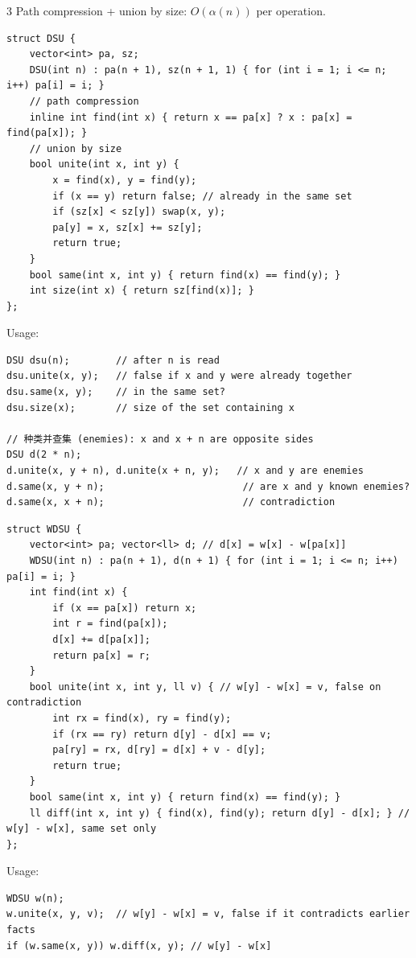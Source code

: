 \documentclass[8pt]{extarticle}
\begin{document}
\begin{multicols*}{3}
Path compression + union by size: $O(\alpha(n))$ per operation.

\begin{lstlisting}
struct DSU {
    vector<int> pa, sz;
    DSU(int n) : pa(n + 1), sz(n + 1, 1) { for (int i = 1; i <= n; i++) pa[i] = i; }
    // path compression
    inline int find(int x) { return x == pa[x] ? x : pa[x] = find(pa[x]); }
    // union by size
    bool unite(int x, int y) {
        x = find(x), y = find(y);
        if (x == y) return false; // already in the same set
        if (sz[x] < sz[y]) swap(x, y);
        pa[y] = x, sz[x] += sz[y];
        return true;
    }
    bool same(int x, int y) { return find(x) == find(y); }
    int size(int x) { return sz[find(x)]; }
};
\end{lstlisting}

Usage:

\begin{lstlisting}
DSU dsu(n);        // after n is read
dsu.unite(x, y);   // false if x and y were already together
dsu.same(x, y);    // in the same set?
dsu.size(x);       // size of the set containing x

// 种类并查集 (enemies): x and x + n are opposite sides
DSU d(2 * n);
d.unite(x, y + n), d.unite(x + n, y);   // x and y are enemies
d.same(x, y + n);                        // are x and y known enemies?
d.same(x, x + n);                        // contradiction
\end{lstlisting}

\begin{lstlisting}
struct WDSU {
    vector<int> pa; vector<ll> d; // d[x] = w[x] - w[pa[x]]
    WDSU(int n) : pa(n + 1), d(n + 1) { for (int i = 1; i <= n; i++) pa[i] = i; }
    int find(int x) {
        if (x == pa[x]) return x;
        int r = find(pa[x]);
        d[x] += d[pa[x]];
        return pa[x] = r;
    }
    bool unite(int x, int y, ll v) { // w[y] - w[x] = v, false on contradiction
        int rx = find(x), ry = find(y);
        if (rx == ry) return d[y] - d[x] == v;
        pa[ry] = rx, d[ry] = d[x] + v - d[y];
        return true;
    }
    bool same(int x, int y) { return find(x) == find(y); }
    ll diff(int x, int y) { find(x), find(y); return d[y] - d[x]; } // w[y] - w[x], same set only
};
\end{lstlisting}

Usage:

\begin{lstlisting}
WDSU w(n);
w.unite(x, y, v);  // w[y] - w[x] = v, false if it contradicts earlier facts
if (w.same(x, y)) w.diff(x, y); // w[y] - w[x]


\end{lstlisting}
\end{multicols*}
\end{document}
